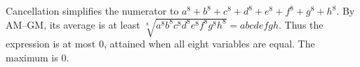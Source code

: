 Cancellation simplifies the numerator to $a^8+b^8+c^8+d^8+e^8+f^8+g^8+h^8$. By AM--GM, its average is at least $\sqrt[8]{a^8b^8c^8d^8e^8f^8g^8h^8}=abcdefgh$. Thus the expression is at most 0, attained when all eight variables are equal. The maximum is $\boxed0$.
